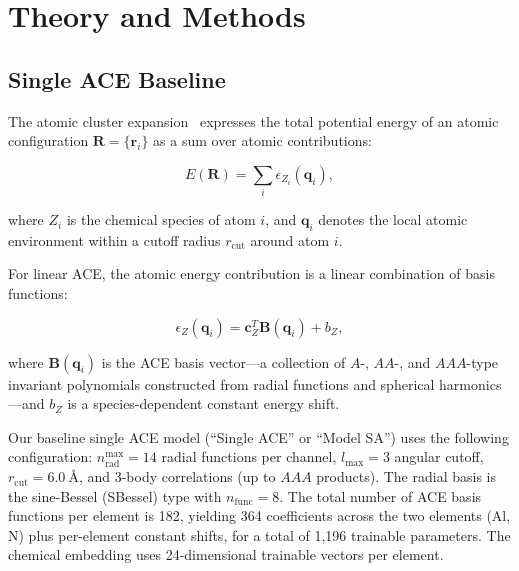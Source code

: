 \documentclass[twoside,prb,aps,floatfix,superscriptaddress,longbibliography]{revtex4-2}
\begin{document}
\section{Theory and Methods}
\label{sec:methods}

\subsection{Single ACE Baseline}
\label{sec:single_ace}

The atomic cluster expansion~\cite{Drautz2019ACE} expresses the total potential energy of an atomic configuration $\mathbf{R} = \{\mathbf{r}_i\}$ as a sum over atomic contributions:

\begin{equation}
E(\mathbf{R}) = \sum_{i} \epsilon_{Z_i}(\mathbf{q}_i),
\label{eq:ace_total}
\end{equation}

where $Z_i$ is the chemical species of atom $i$, and $\mathbf{q}_i$ denotes the local atomic environment within a cutoff radius $r_{\mathrm{cut}}$ around atom $i$.

For linear ACE, the atomic energy contribution is a linear combination of basis functions:

\begin{equation}
\epsilon_{Z}(\mathbf{q}_i) = \mathbf{c}_{Z}^T \mathbf{B}(\mathbf{q}_i) + b_{Z},
\label{eq:ace_linear}
\end{equation}

where $\mathbf{B}(\mathbf{q}_i)$ is the ACE basis vector---a collection of $A$-, $AA$-, and $AAA$-type invariant polynomials constructed from radial functions and spherical harmonics---and $b_Z$ is a species-dependent constant energy shift.

Our baseline single ACE model (``Single ACE'' or ``Model SA'') uses the following configuration: $n_{\mathrm{rad}}^{\mathrm{max}} = 14$ radial functions per channel, $l_{\mathrm{max}} = 3$ angular cutoff, $r_{\mathrm{cut}} = \SI{6.0}{\angstrom}$, and 3-body correlations (up to $AAA$ products). The radial basis is the sine-Bessel (SBessel) type with $n_{\mathrm{func}} = 8$. The total number of ACE basis functions per element is 182, yielding 364 coefficients across the two elements (Al, N) plus per-element constant shifts, for a total of 1,196 trainable parameters. The chemical embedding uses 24-dimensional trainable vectors per element.
\end{document}
